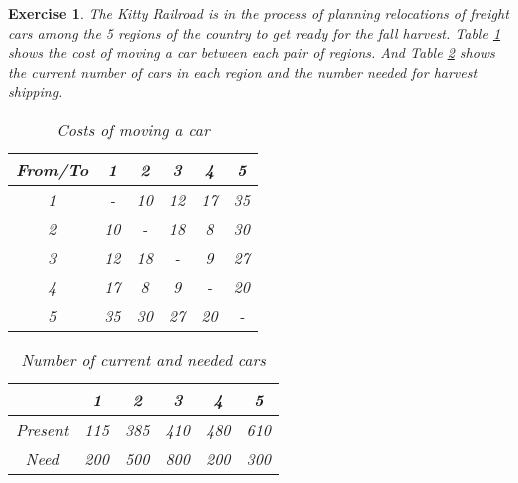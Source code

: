 \documentclass[12pt]{article}
\theoremstyle{colon}
\newtheorem{exercise}{Exercise}
\begin{document}
\begin{exercise}
  The Kitty Railroad is in the process of planning relocations of freight cars among the 5 regions of the country to get ready for the fall harvest. Table \ref{table:costs} shows the cost of moving a car between each pair of regions. And Table \ref{table:cars} shows the current number of cars in each region and the number needed for harvest shipping.
  \begin{table}[h]
    \begin{center}
      \begin{tabular}{| c | c c c c c |}
        \hline
        From/To & 1 & 2 & 3 & 4 & 5 \\
        \hline
        1 & - & 10 & 12 & 17 & 35 \\
        2 & 10 & - & 18 & 8 & 30 \\
        3 & 12 & 18 & - & 9 & 27 \\
        4 & 17 & 8 & 9 & - & 20 \\
        5 & 35 & 30 & 27 & 20 & - \\
        \hline
      \end{tabular}
    \end{center}
    \caption{Costs of moving a car}
    \label{table:costs}
  \end{table}

  \begin{table}[h]
    \begin{center}
      \begin{tabular}{| c | c c c c c |}
        \hline
         & 1 & 2 & 3 & 4 & 5 \\
        \hline
        Present & 115 & 385 & 410 & 480 & 610 \\
        Need & 200 & 500 & 800 & 200 & 300 \\
        \hline
      \end{tabular}
    \end{center}
    \caption{Number of current and needed cars}
    \label{table:cars}
  \end{table}
\end{exercise}
\end{document}
